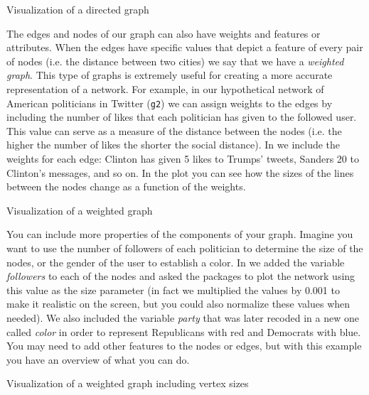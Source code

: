 \begin{ccsexample}
  \caption{Visualization of a directed graph}
  \label{ex:visdirected}
\end{ccsexample}


The edges and nodes of our graph can also have weights and features or attributes. When the edges have specific values that depict a feature of every pair of nodes (i.e. the distance between two cities) we say that we have a \textit{weighted graph}. This type of graphs is extremely useful for creating a more accurate representation of a network. For example, in our hypothetical network of American politicians in Twitter (\texttt{g2}) we can assign weights to the edges by including the number of likes that each politician has given to the followed user. This value  can serve as a measure of the distance between the nodes (i.e. the higher the number of likes the shorter the social distance). In  we include the weights for each edge: Clinton has given 5 likes to Trumps' tweets, Sanders 20 to Clinton's messages, and so on. In the plot you can see how the sizes of the lines between the nodes change as a function of the weights.

\begin{ccsexample}
  \caption{Visualization of a weighted graph}
  \label{ex:weighted}
\end{ccsexample}


You can include more properties of the components of your graph. Imagine you want to use the number of followers of each politician to determine the size of the nodes, or the gender of the user to establish a color. In  we added the variable \emph{followers} to each of the nodes and asked the packages to plot the network using this value as the size parameter (in fact we multiplied the values by 0.001 to make it realistic on the screen, but you could also normalize these values when needed). We also included the variable \emph{party} that was later recoded in a new one called \emph{color} in order to represent Republicans with red and Democrats with blue.  You may need to add other features to the nodes or edges, but with this example you have an overview of what you can do.

\begin{ccsexample}
  \caption{Visualization of a weighted graph including vertex sizes}
  \label{ex:weighted2}
\end{ccsexample}

